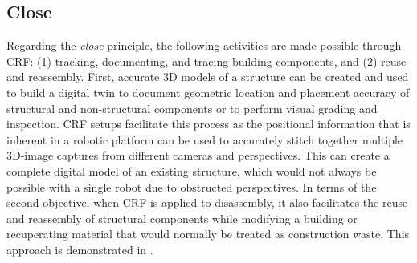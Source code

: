 \subsection{Close} \label{sec:03_03_close}
    Regarding the \textit{close} principle, the following activities are made possible through CRF: (1) tracking, documenting, and tracing building components, and (2) reuse and reassembly. First, accurate 3D models of a structure can be created and used to build a digital twin to document geometric location and placement accuracy of structural and non-structural components or to perform visual grading and inspection. CRF setups facilitate this process as the positional information that is inherent in a robotic platform can be used to accurately stitch together multiple 3D-image captures from different cameras and perspectives. This can create a complete digital model of an existing structure, which would not always be possible with a single robot due to obstructed perspectives. In terms of the second objective, when CRF is applied to disassembly, it also facilitates the reuse and reassembly of structural components while modifying a building or recuperating material that would normally be treated as construction waste. This approach is demonstrated in  \citep{bruun_zerowaste_2022, bruun_zerowaste_2024}. 






\newpage
 

\begingroup
    \hypersetup{hidelinks} %
    
\endgroup